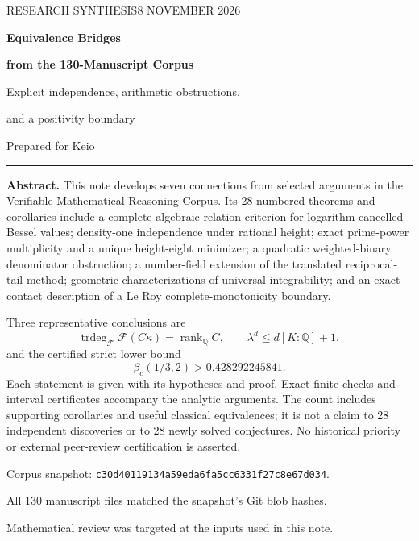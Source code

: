 \documentclass[11pt,a4paper]{article}
\theoremstyle{definition}
\theoremstyle{remark}
\numberwithin{equation}{section}
\begin{document}
\begin{titlepage}
\vspace*{13mm}
{\small\sffamily\color{muted}RESEARCH SYNTHESIS\hfill 8 NOVEMBER 2026\par}
\vspace{13mm}
{\Huge\bfseries\color{inkblue}Equivalence Bridges\par}
\vspace{3mm}
{\LARGE\bfseries\color{inkblue}from the 130-Manuscript Corpus\par}
\vspace{8mm}
{\Large Explicit independence, arithmetic obstructions,\par
and a positivity boundary\par}
\vspace{9mm}
{\large Prepared for Keio\par}
\vspace{8mm}
\hrule
\vspace{7mm}
\textbf{Abstract.}
This note develops seven connections from selected arguments in the
Verifiable Mathematical Reasoning Corpus. Its 28 numbered theorems and
corollaries include a complete algebraic-relation criterion for
logarithm-cancelled Bessel values; density-one independence under rational
height; exact prime-power multiplicity and a unique height-eight
minimizer; a quadratic weighted-binary denominator obstruction;
a number-field extension of the translated reciprocal-tail method;
geometric characterizations of universal integrability; and an exact
contact description of a Le Roy complete-monotonicity boundary.

Three representative conclusions are
\[
 \operatorname{trdeg}_{\mathcal F}\mathcal F(C\kappa)
       =\operatorname{rank}_{\mathbb Q}C,
 \qquad
 \lambda^d\le d[K:\mathbb Q]+1,
\]
and the certified strict lower bound
\[
 \beta_c(1/3,2)>0.428292245841.
\]
Each statement is given with its hypotheses and proof. Exact finite
checks and interval certificates accompany the analytic arguments.
The count includes supporting corollaries and useful classical
equivalences; it is not a claim to 28 independent discoveries or to
28 newly solved conjectures. No historical priority or external
peer-review certification is asserted.
\vfill
{\small\color{muted}
Corpus snapshot: \texttt{c30d40119134a59eda6fa5cc6331f27c8e67d034}.\par
All 130 manuscript files matched the snapshot's Git blob hashes.\par
Mathematical review was targeted at the inputs used in this note.}
\end{titlepage}
\setcounter{page}{2}
\end{document}
